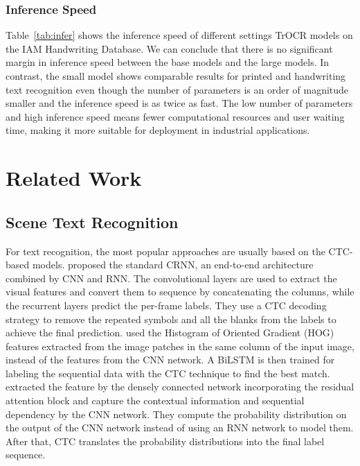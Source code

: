 \documentclass[letterpaper]{article} \usepackage{aaai23}  \usepackage{times}  \usepackage{helvet}  \usepackage{courier}  \usepackage[hyphens]{url}  \usepackage{graphicx} \urlstyle{rm} \def\UrlFont{\rm}  \usepackage{natbib}  \usepackage{caption} \frenchspacing  \setlength{\pdfpagewidth}{8.5in} \setlength{\pdfpageheight}{11in} \usepackage{algorithm}
\begin{document}
\subsubsection{Inference Speed}
Table~\ref{tab:infer} shows the inference speed of different settings TrOCR models on the IAM Handwriting Database. We can conclude that there is no significant margin in inference speed between the base models and the large models. In contrast, the small model shows comparable results for printed and handwriting text recognition even though the number of parameters is an order of magnitude smaller and the inference speed is as twice as fast. The low number of parameters and high inference speed means fewer computational resources and user waiting time, making it more suitable for deployment in industrial applications.







\section{Related Work}


\subsection{Scene Text Recognition}
For text recognition, the most popular approaches are usually based on the CTC-based models. \cite{shi2016end} proposed the standard CRNN, an end-to-end architecture combined by CNN and RNN. The convolutional layers are used to extract the visual features and convert them to sequence by concatenating the columns, while the recurrent layers predict the per-frame labels. They use a CTC decoding strategy to remove the repeated symbols and all the blanks from the labels to achieve the final prediction. 
\cite{su2014accurate} used the Histogram of Oriented Gradient (HOG) features extracted from the image patches in the same column of the input image, instead of the features from the CNN network. A BiLSTM is then trained for labeling the sequential data with the CTC technique to find the best match.
\cite{gao2019reading} extracted the feature by the densely connected network incorporating the residual attention block and capture the contextual information and sequential dependency by the CNN network. They compute the probability distribution on the output of the CNN network instead of using an RNN network to model them. After that, CTC translates the probability distributions into the final label sequence. 
\end{document}
